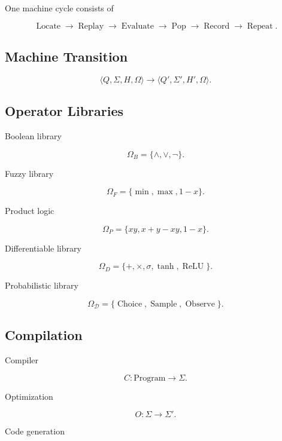 \documentclass[12pt,oneside]{article}
\theoremstyle{definition}
\theoremstyle{remark}
\begin{document}
One machine cycle consists of

\[
\operatorname{Locate}
\rightarrow
\operatorname{Replay}
\rightarrow
\operatorname{Evaluate}
\rightarrow
\operatorname{Pop}
\rightarrow
\operatorname{Record}
\rightarrow
\operatorname{Repeat}.
\]

\subsection*{Machine Transition}

\[
\langle
Q,
\Sigma,
H,
\Omega
\rangle
\longrightarrow
\langle
Q',
\Sigma',
H',
\Omega
\rangle.
\]

\subsection*{Operator Libraries}

Boolean library

\[
\Omega_B
=
\{
\land,
\lor,
\neg
\}.
\]

Fuzzy library

\[
\Omega_F
=
\{
\min,
\max,
1-x
\}.
\]

Product logic

\[
\Omega_P
=
\{
xy,
x+y-xy,
1-x
\}.
\]

Differentiable library

\[
\Omega_D
=
\{
+,
\times,
\sigma,
\tanh,
\operatorname{ReLU}
\}.
\]

Probabilistic library

\[
\Omega_{\mathcal D}
=
\{
\operatorname{Choice},
\operatorname{Sample},
\operatorname{Observe}
\}.
\]

\subsection*{Compilation}

Compiler

\[
C
:
\text{Program}
\rightarrow
\Sigma.
\]

Optimization

\[
O
:
\Sigma
\rightarrow
\Sigma'.
\]

Code generation
\end{document}
